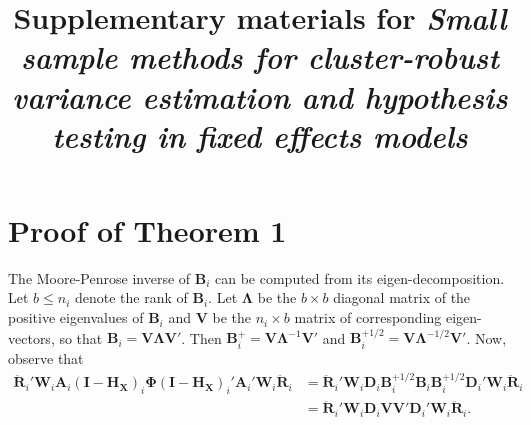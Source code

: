 \documentclass{article}\usepackage[]{graphicx}\usepackage[]{color}
\title{Supplementary materials for \textit{Small sample methods for cluster-robust variance estimation and hypothesis testing in fixed effects models}}
\newcommand{\bm}{\mathbf}
\newcommand{\bs}{\boldsymbol}
\begin{document}
\maketitle

\section{Proof of Theorem 1}

The Moore-Penrose inverse of $\bm{B}_i$ can be computed from its eigen-decomposition. Let $b \leq n_i$ denote the rank of $\bm{B}_i$. 
Let $\bs\Lambda$ be the $b \times b$ diagonal matrix of the positive eigenvalues of $\bm{B}_i$ and $\bm{V}$ be the $n_i \times b$ matrix of corresponding eigen-vectors, so that $\bm{B}_i = \bm{V}\bs\Lambda\bm{V}'$. 
Then $\bm{B}_i^+ = \bm{V}\bs\Lambda^{-1}\bm{V}'$ and $\bm{B}_i^{+1/2} = \bm{V}\bs\Lambda^{-1/2}\bm{V}'$. Now, observe that 
\begin{equation}\begin{aligned}
\label{eq:step1}
\bm{\ddot{R}}_i' \bm{W}_i \bm{A}_i \left(\bm{I} - \bm{H_X}\right)_i \bs\Phi \left(\bm{I} - \bm{H_X}\right)_i' \bm{A}_i' \bm{W}_i \bm{\ddot{R}}_i &= \bm{\ddot{R}}_i' \bm{W}_i \bm{D}_i \bm{B}_i^{+1/2} \bm{B}_i \bm{B}_i^{+1/2} \bm{D}_i' \bm{W}_i \bm{\ddot{R}}_i \\
&= \bm{\ddot{R}}_i' \bm{W}_i \bm{D}_i \bm{V}\bm{V}' \bm{D}_i' \bm{W}_i \bm{\ddot{R}}_i. 
\end{aligned}\end{equation}
\end{document}
